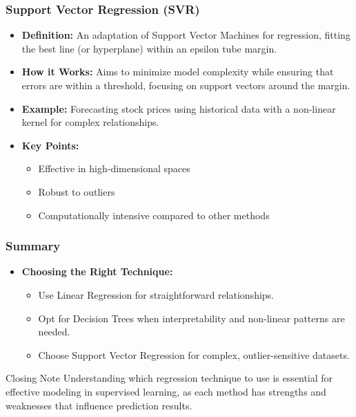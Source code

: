 \documentclass[aspectratio=169]{beamer}
\begin{document}
\begin{frame}[fragile]
    \frametitle{Support Vector Regression (SVR)}
    \begin{itemize}
        \item \textbf{Definition:} An adaptation of Support Vector Machines for regression, fitting the best line (or hyperplane) within an epsilon tube margin.
        \item \textbf{How it Works:} Aims to minimize model complexity while ensuring that errors are within a threshold, focusing on support vectors around the margin.
        \item \textbf{Example:} Forecasting stock prices using historical data with a non-linear kernel for complex relationships.
        \item \textbf{Key Points:}
        \begin{itemize}
            \item Effective in high-dimensional spaces
            \item Robust to outliers
            \item Computationally intensive compared to other methods
        \end{itemize}
    \end{itemize}
\end{frame}

\begin{frame}[fragile]
    \frametitle{Summary}
    \begin{itemize}
        \item \textbf{Choosing the Right Technique:}
        \begin{itemize}
            \item Use Linear Regression for straightforward relationships.
            \item Opt for Decision Trees when interpretability and non-linear patterns are needed.
            \item Choose Support Vector Regression for complex, outlier-sensitive datasets.
        \end{itemize}
    \end{itemize}
    \begin{block}{Closing Note}
        Understanding which regression technique to use is essential for effective modeling in supervised learning, as each method has strengths and weaknesses that influence prediction results.
    \end{block}
\end{frame}
\end{document}
